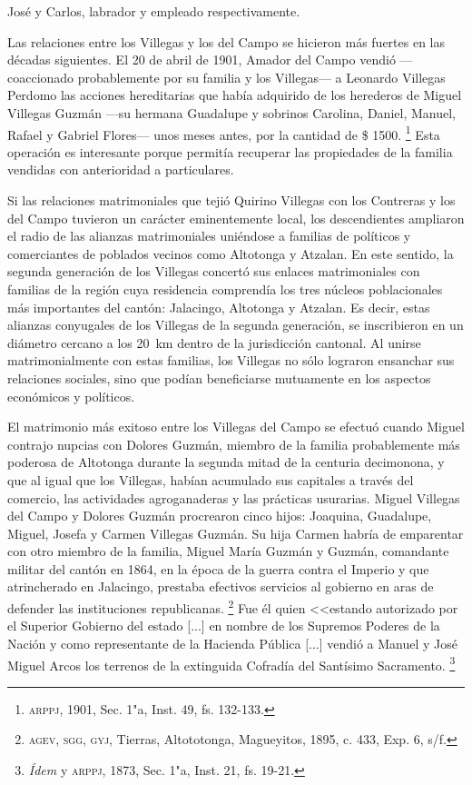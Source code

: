 \documentclass[14pt,twoside,final]{extbook} %
\let\oldfootnote\footnote
\renewcommand\footnote[1]{%
\oldfootnote{\hspace{1mm}#1}}
\begin{document}
José y Carlos, labrador y empleado respectivamente.

Las relaciones entre los Villegas y los del Campo se hicieron más fuertes en las décadas siguientes. El 20 de abril de 1901, Amador del Campo vendió ---coaccionado probablemente por su familia y los Villegas--- a Leonardo Villegas Perdomo las acciones hereditarias que había adquirido de los herederos de Miguel Villegas Guzmán ---su hermana Guadalupe y sobrinos Carolina, Daniel, Manuel, Rafael y Gabriel Flores--- unos meses antes, por la cantidad de \$ 1500.\footnote{\textsc{arppj}, 1901, Sec. 1"a, Inst. 49, fs. 132-133.} Esta operación es interesante porque permitía recuperar las propiedades de la familia vendidas con anterioridad a particulares.

Si las relaciones matrimoniales que tejió Quirino Villegas con los Contreras y los del Campo tuvieron un carácter eminentemente local, los descendientes ampliaron el radio de las alianzas matrimoniales uniéndose a familias de políticos y comerciantes de poblados vecinos como Altotonga y Atzalan. En este sentido, la segunda generación de los Villegas concertó sus enlaces matrimoniales con familias de la región cuya residencia comprendía los tres núcleos poblacionales más importantes del cantón: Jalacingo, Altotonga y Atzalan. Es decir, estas alianzas conyugales de los Villegas de la segunda generación, se inscribieron en un diámetro cercano a los 20~km dentro de la jurisdicción cantonal. Al unirse matrimonialmente con estas familias, los Villegas no sólo lograron ensanchar sus relaciones sociales, sino que podían beneficiarse mutuamente en los aspectos económicos y políticos.

El matrimonio más exitoso entre los Villegas del Campo se efectuó cuando Miguel contrajo nupcias con Dolores Guzmán, miembro de la familia probablemente más poderosa de Altotonga durante la segunda mitad de la centuria decimonona, y que al igual que los Villegas, habían acumulado sus capitales a través del comercio, las actividades agroganaderas y las prácticas usurarias. Miguel Villegas del Campo y Dolores Guzmán procrearon cinco hijos: Joaquina, Guadalupe, Miguel, Josefa y Carmen Villegas Guzmán. Su hija Carmen habría de emparentar con otro miembro de la familia, Miguel María Guzmán y Guzmán, comandante militar del cantón en 1864, en la época de la guerra contra el Imperio y que atrincherado en Jalacingo, prestaba efectivos servicios al gobierno en aras de defender las instituciones republicanas.\footnote{\textsc{agev, sgg, gyj}, Tierras, Altototonga, Magueyitos, 1895, c. 433, Exp. 6, s/f.} Fue él quien <<estando autorizado por el Superior Gobierno del estado [...] en nombre de los Supremos Poderes de la Nación y como representante de la Hacienda Pública [...] vendió a Manuel y José Miguel Arcos los terrenos de la extinguida Cofradía del Santísimo Sacramento.\footnote{\emph{Ídem} y \textsc{arppj}, 1873, Sec. 1"a, Inst. 21, fs. 19-21.}
\end{document}
